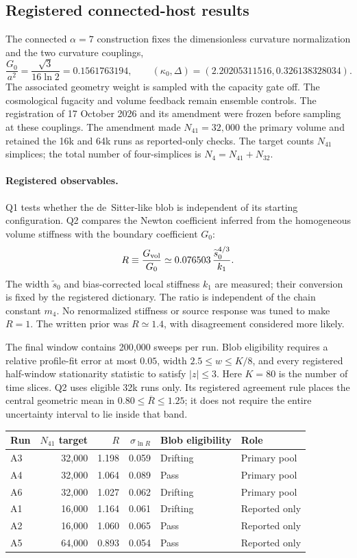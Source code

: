 \subsection{Registered connected-host results}
\label{sec:alpha7results}

The connected $\alpha=7$ construction fixes the dimensionless curvature
normalization and the two curvature couplings,
\[
 \frac{G_0}{a^2}=\frac{\sqrt3}{16\ln2}=0.1561763194,\qquad
 (\kappa_0,\Delta)=(2.20205311516,0.326138328034).
\]
The associated geometry weight is sampled with the capacity gate off.
The cosmological fugacity and volume feedback remain ensemble controls.
The registration of 17 October 2026 and its amendment were frozen before
sampling at these couplings. The amendment made $N_{41}=32{,}000$ the
primary volume and retained the 16k and 64k runs as reported-only checks.
The target counts $N_{41}$ simplices; the total number of four-simplices is
$N_4=N_{41}+N_{32}$.

\paragraph{Registered observables.}
Q1 tests whether the de~Sitter-like blob is independent of its starting
configuration. Q2 compares the Newton coefficient inferred from the
homogeneous volume stiffness with the boundary coefficient $G_0$:
\[
 R\equiv\frac{G_{\rm vol}}{G_0}
 \simeq 0.076503\,\frac{\widetilde s_0^{4/3}}{k_1}.
\]
The width $\widetilde s_0$ and bias-corrected local stiffness $k_1$ are
measured; their conversion is fixed by the registered dictionary. The
ratio is independent of the chain constant $m_4$. No
renormalized stiffness or source response was tuned to make $R=1$.
The written prior was $R\simeq1.4$, with disagreement considered more likely.

The final window contains 200,000 sweeps per run. Blob eligibility requires
a relative profile-fit error at most $0.05$, width $2.5\leq w\leq K/8$,
and every registered half-window stationarity statistic to satisfy
$|z|\leq3$. Here $K=80$ is the number of time slices. Q2 uses eligible
32k runs only. Its registered agreement rule places the central geometric
mean in $0.80\leq\overline R\leq1.25$; it does not require the entire
uncertainty interval to lie inside that band.

\begin{center}
\small
\begin{tabular}{lrrrll}
\hline
Run & $N_{41}$ target & $R$ & $\sigma_{\ln R}$ & Blob eligibility & Role\\
\hline
A3 & 32,000 & 1.198 & 0.059 & Drifting & Primary pool\\
A4 & 32,000 & 1.064 & 0.089 & Pass & Primary pool\\
A6 & 32,000 & 1.027 & 0.062 & Drifting & Primary pool\\
A1 & 16,000 & 1.164 & 0.061 & Drifting & Reported only\\
A2 & 16,000 & 1.060 & 0.065 & Pass & Reported only\\
A5 & 64,000 & 0.893 & 0.054 & Pass & Reported only\\
\hline
\end{tabular}
\end{center}

